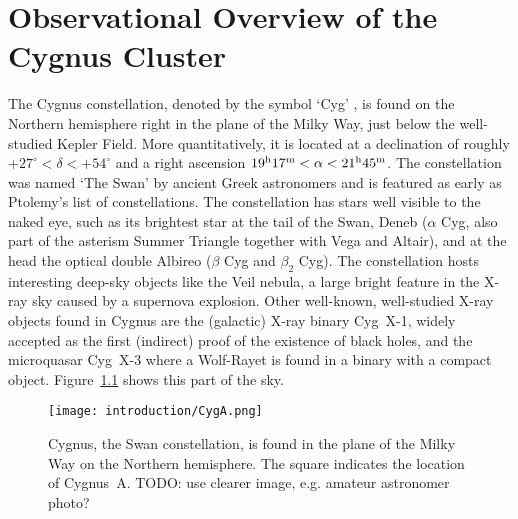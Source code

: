 \documentclass[MScProj_TLRH_ClusterEnergy.tex]{subfiles}
\begin{document}
\chapter{Observational Overview of the Cygnus Cluster}
\label{sec:cygnus}

The Cygnus constellation, denoted by the symbol `Cyg'
\citep{1922PA.....30..469R}, is found on the Northern hemisphere right in the
plane of the Milky Way, just below the well-studied Kepler Field. More
quantitatively, it is located at a declination of roughly $+27^\circ < \delta <
+54^\circ$ and a right ascension $19^{\rm h}17^{\rm m} < \alpha < 21^{\rm
h}45^{\rm m}$. The constellation was named `The Swan' by ancient Greek
astronomers and is featured as early as Ptolemy's list of constellations. The
constellation has stars well visible to the naked eye, such as its brightest
star at the tail of the Swan, Deneb ($\alpha$ Cyg, also part of the asterism
Summer Triangle together with Vega and Altair), and at the head the
optical double Albireo ($\beta$ Cyg and $\beta_2$ Cyg). The
constellation hosts interesting deep-sky objects like the Veil nebula, a large
bright feature in the X-ray sky caused by a supernova explosion. Other
well-known, well-studied X-ray objects found in Cygnus are the (galactic) X-ray
binary Cyg~X-1, widely accepted as the first (indirect) proof of the existence of black
holes, and the microquasar Cyg~X-3 where a Wolf-Rayet is found in a binary with a 
compact object. Figure~\ref{fig:CygAMilkyway} shows this part of the sky.

\begin{figure}
\centering
\texttt{[image: introduction/CygA.png]}
\caption{Cygnus, the Swan constellation, is found in the plane of the Milky Way
         on the Northern hemisphere. The square indicates the location of Cygnus~A.
         TODO: use clearer image, e.g. amateur astronomer photo?}
\label{fig:CygAMilkyway}
\end{figure}
\end{document}
